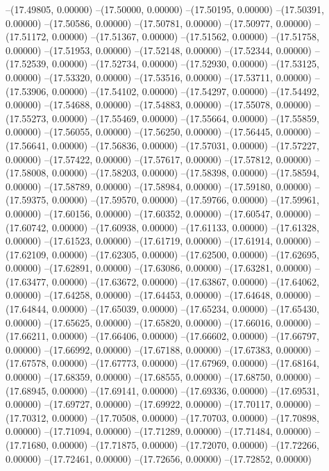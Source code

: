 --(17.49805, 0.00000)
--(17.50000, 0.00000)
--(17.50195, 0.00000)
--(17.50391, 0.00000)
--(17.50586, 0.00000)
--(17.50781, 0.00000)
--(17.50977, 0.00000)
--(17.51172, 0.00000)
--(17.51367, 0.00000)
--(17.51562, 0.00000)
--(17.51758, 0.00000)
--(17.51953, 0.00000)
--(17.52148, 0.00000)
--(17.52344, 0.00000)
--(17.52539, 0.00000)
--(17.52734, 0.00000)
--(17.52930, 0.00000)
--(17.53125, 0.00000)
--(17.53320, 0.00000)
--(17.53516, 0.00000)
--(17.53711, 0.00000)
--(17.53906, 0.00000)
--(17.54102, 0.00000)
--(17.54297, 0.00000)
--(17.54492, 0.00000)
--(17.54688, 0.00000)
--(17.54883, 0.00000)
--(17.55078, 0.00000)
--(17.55273, 0.00000)
--(17.55469, 0.00000)
--(17.55664, 0.00000)
--(17.55859, 0.00000)
--(17.56055, 0.00000)
--(17.56250, 0.00000)
--(17.56445, 0.00000)
--(17.56641, 0.00000)
--(17.56836, 0.00000)
--(17.57031, 0.00000)
--(17.57227, 0.00000)
--(17.57422, 0.00000)
--(17.57617, 0.00000)
--(17.57812, 0.00000)
--(17.58008, 0.00000)
--(17.58203, 0.00000)
--(17.58398, 0.00000)
--(17.58594, 0.00000)
--(17.58789, 0.00000)
--(17.58984, 0.00000)
--(17.59180, 0.00000)
--(17.59375, 0.00000)
--(17.59570, 0.00000)
--(17.59766, 0.00000)
--(17.59961, 0.00000)
--(17.60156, 0.00000)
--(17.60352, 0.00000)
--(17.60547, 0.00000)
--(17.60742, 0.00000)
--(17.60938, 0.00000)
--(17.61133, 0.00000)
--(17.61328, 0.00000)
--(17.61523, 0.00000)
--(17.61719, 0.00000)
--(17.61914, 0.00000)
--(17.62109, 0.00000)
--(17.62305, 0.00000)
--(17.62500, 0.00000)
--(17.62695, 0.00000)
--(17.62891, 0.00000)
--(17.63086, 0.00000)
--(17.63281, 0.00000)
--(17.63477, 0.00000)
--(17.63672, 0.00000)
--(17.63867, 0.00000)
--(17.64062, 0.00000)
--(17.64258, 0.00000)
--(17.64453, 0.00000)
--(17.64648, 0.00000)
--(17.64844, 0.00000)
--(17.65039, 0.00000)
--(17.65234, 0.00000)
--(17.65430, 0.00000)
--(17.65625, 0.00000)
--(17.65820, 0.00000)
--(17.66016, 0.00000)
--(17.66211, 0.00000)
--(17.66406, 0.00000)
--(17.66602, 0.00000)
--(17.66797, 0.00000)
--(17.66992, 0.00000)
--(17.67188, 0.00000)
--(17.67383, 0.00000)
--(17.67578, 0.00000)
--(17.67773, 0.00000)
--(17.67969, 0.00000)
--(17.68164, 0.00000)
--(17.68359, 0.00000)
--(17.68555, 0.00000)
--(17.68750, 0.00000)
--(17.68945, 0.00000)
--(17.69141, 0.00000)
--(17.69336, 0.00000)
--(17.69531, 0.00000)
--(17.69727, 0.00000)
--(17.69922, 0.00000)
--(17.70117, 0.00000)
--(17.70312, 0.00000)
--(17.70508, 0.00000)
--(17.70703, 0.00000)
--(17.70898, 0.00000)
--(17.71094, 0.00000)
--(17.71289, 0.00000)
--(17.71484, 0.00000)
--(17.71680, 0.00000)
--(17.71875, 0.00000)
--(17.72070, 0.00000)
--(17.72266, 0.00000)
--(17.72461, 0.00000)
--(17.72656, 0.00000)
--(17.72852, 0.00000)

